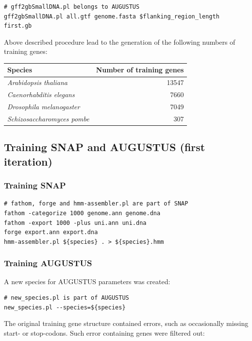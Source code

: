 \documentclass[a4paper,10pt]{report}
\begin{document}
\begin{verbatim}
# gff2gbSmallDNA.pl belongs to AUGUSTUS
gff2gbSmallDNA.pl all.gtf genome.fasta $flanking_region_length first.gb
\end{verbatim}

\noindent Above described procedure lead to the generation of the following numbers of training genes:

\begin{center}
\begin{tabular}{l r}
\hline
Species & Number of training genes\\
\hline
\textit{Arabidopsis thaliana} & 13547\\
\textit{Caenorhabditis elegans} & 7660\\
\textit{Drosophila melanogaster} & 7049\\
\textit{Schizosaccharomyces pombe} & 307\\
\hline
\end{tabular}
\end{center}

\subsection{Training SNAP and AUGUSTUS (first iteration)}

\subsubsection{Training SNAP} \label{train_snap_it1}

\begin{verbatim}
# fathom, forge and hmm-assembler.pl are part of SNAP
fathom -categorize 1000 genome.ann genome.dna
fathom -export 1000 -plus uni.ann uni.dna
forge export.ann export.dna
hmm-assembler.pl ${species} . > ${species}.hmm
\end{verbatim}

\subsubsection{Training AUGUSTUS} \label{train_augustus_it1}

A new species for AUGUSTUS parameters was created:

\begin{verbatim}
# new_species.pl is part of AUGUSTUS
new_species.pl --species=${species}
\end{verbatim}


\noindent The original training gene structure contained errors, such as occasionally missing start- or stop-codons. Such error containing genes were filtered out:\\
\end{document}
